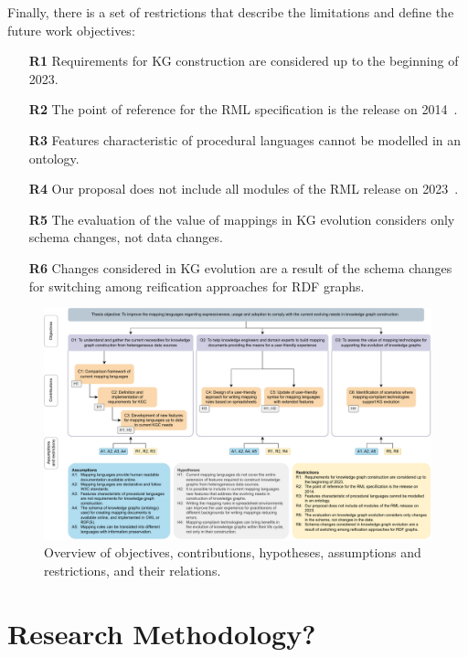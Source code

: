 Finally, there is a set of restrictions that describe the limitations and define the future work objectives:

\begin{enumerate}
    \item[\textbf{R1}] Requirements for KG construction are considered up to the beginning of 2023.
    \item[\textbf{R2}] The point of reference for the RML specification is the release on 2014~\cite{Dimou2014rml}.
    \item[\textbf{R3}] Features characteristic of procedural languages cannot be modelled in an ontology.
    \item[\textbf{R4}] Our proposal does not include all modules of the RML release on 2023~\cite{iglesias2023rml}.
    \item[\textbf{R5}] The evaluation of the value of mappings in KG evolution considers only schema changes, not data changes.
    \item[\textbf{R6}] Changes considered in KG evolution are a result of the schema changes for switching among reification approaches for RDF graphs.
    \end{enumerate}


\begin{figure}
    \centering
    \includegraphics[width=1\linewidth]{figures/chp3_summary.pdf}
    \caption[Relations between objectives, contributions, hypotheses, assumptions and restrictions of this thesis]{Overview of objectives, contributions, hypotheses, assumptions and restrictions, and their relations.}
    \label{fig:chp3_summary}
\end{figure}

\section{Research Methodology?}


